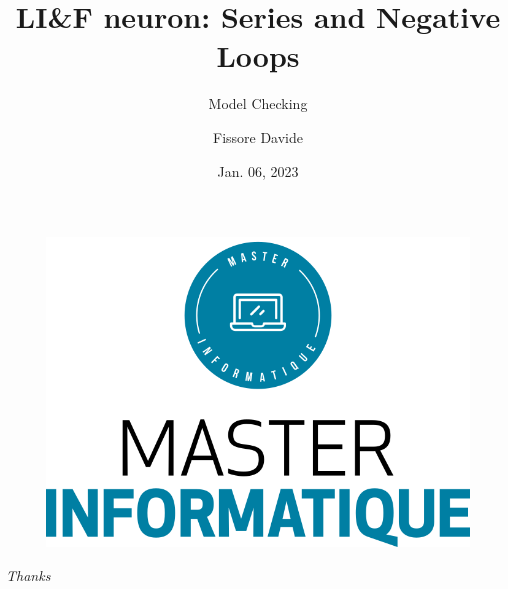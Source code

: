 \documentclass[usenames,dvipsnames]{beamer}
\author{Fissore Davide}
\title{LI\&F neuron: Series and Negative Loops}
\subtitle{Model Checking}
\institute{Université Côte d'Azur}
\date{Jan. 06, 2023}
\begin{document}
\begin{frame}
    \titlepage
    \begin{figure}[htpb]
        \begin{center}
            \includegraphics[width=0.2\linewidth]{pic/logo_master.png}
        \end{center}
    \end{figure}
\end{frame}


\begingroup
\AtBeginSection[] {}





\endgroup

\begin{frame}{}
    \centering \Large
    \emph{Thanks}
\end{frame}
\end{document}

